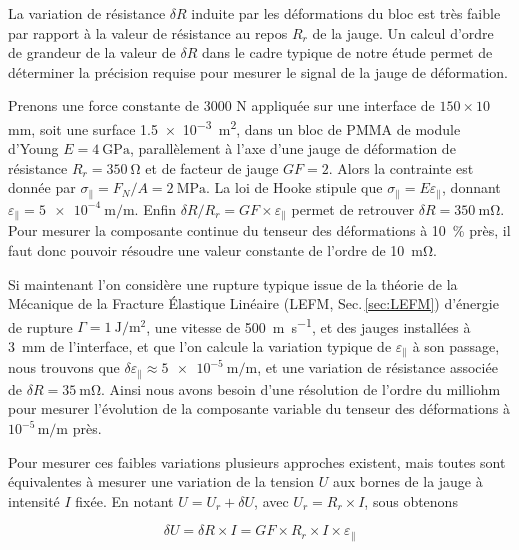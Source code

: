 
La variation de résistance $\delta R$ induite par les déformations du bloc est très faible par rapport à la valeur de résistance au repos $R_r$ de la jauge. Un calcul d'ordre de grandeur de la valeur de $\delta R$ dans le cadre typique de notre étude permet de déterminer la précision requise pour mesurer le signal de la jauge de déformation.

Prenons une force constante de 3000 N appliquée sur une interface de $150\times10$ mm, soit une surface \SI{1.5e-3}{\square\meter}, dans un bloc de PMMA de module d'Young $E=\SI{4}{\giga\pascal}$, parallèlement à l'axe d'une jauge de déformation de résistance $R_r=\SI{350}{\ohm}$ et de facteur de jauge $GF=2$. Alors la contrainte est donnée par
$\sigma_{\parallel} = {F_N}/{A} = \SI{2}{\mega\pascal}$. La loi de Hooke stipule que $\sigma_{\parallel}=E\varepsilon_{\parallel}$, donnant $\varepsilon_{\parallel} = \qty[per-mode = symbol]{5e-4}{\meter\per\meter}$. Enfin $\delta R/R_r = GF\times \varepsilon_{\parallel}$ permet de retrouver $\delta R =\SI{350}{\milli\ohm}$. Pour mesurer la composante continue du tenseur des déformations à \SI{10}{\percent} près, il faut donc pouvoir résoudre une valeur constante de l'ordre de \SI{10}{\milli\ohm}.

Si maintenant l'on considère une rupture typique issue de la théorie de la Mécanique de la Fracture Élastique Linéaire (LEFM, Sec.\,\ref{sec:LEFM}) d'énergie de rupture $\Gamma=\SI{1}{\joule\per\meter\squared}$, une vitesse de \SI{500}{\meter\per\second}, et des jauges installées à \SI{3}{\milli\meter} de l'interface, et que l'on calcule la variation typique de $\varepsilon_{\parallel}$ à son passage, nous trouvons que $\delta\varepsilon_{\parallel}\approx\qty[per-mode = symbol]{5e-5}{\meter\per\meter}$, et une variation de résistance associée de $\delta R = \SI{35}{\milli\ohm}$. Ainsi nous avons besoin d'une résolution de l'ordre du milliohm pour mesurer l'évolution de la composante variable du tenseur des déformations à $10^{-5}\,\text{m}/\text{m}$ près.

Pour mesurer ces faibles variations plusieurs approches existent, mais toutes sont équivalentes à mesurer une variation de la tension $U$ aux bornes de la jauge à intensité $I$ fixée. En notant $U=U_r+\delta U$, avec $U_r=R_r\times I$, sous obtenons

\begin{equation}
\delta U = \delta R\times I = GF\times R_r\times I\times \varepsilon_{\parallel}
\label{eq:1.2}
\end{equation}

